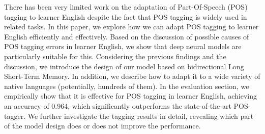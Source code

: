 There has been very limited work on the adaptation of Part-Of-Speech (POS) tagging to learner English despite the fact that POS tagging is widely used in related tasks. In this paper, we explore how we can adapt POS tagging to learner English efficiently and effectively. Based on the discussion of possible causes of POS tagging errors in learner English, we show that deep neural models are particularly suitable for this. Considering the previous findings and the discussion, we introduce the design of our model based on bidirectional Long Short-Term Memory. In addition, we describe how to adapt it to a wide variety of native languages (potentially, hundreds of them). In the evaluation section, we empirically show that it is effective for POS tagging in learner English, achieving an accuracy of 0.964, which significantly outperforms the state-of-the-art POS-tagger. We further investigate the tagging results in detail, revealing which part of the model design does or does not improve the performance.
